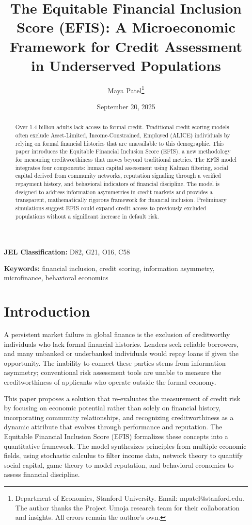 \documentclass{article}
\title{The Equitable Financial Inclusion Score (EFIS): A Microeconomic Framework for Credit Assessment in Underserved Populations}
\author{Maya Patel\thanks{Department of Economics, Stanford University. Email: mpatel@stanford.edu. The author thanks the Project Umoja research team for their collaboration and insights. All errors remain the author's own.}}
\date{September 20, 2025}
\begin{document}
\maketitle

\doublespacing

\begin{abstract}
Over 1.4 billion adults lack access to formal credit. Traditional credit scoring models often exclude Asset-Limited, Income-Constrained, Employed (ALICE) individuals by relying on formal financial histories that are unavailable to this demographic. This paper introduces the Equitable Financial Inclusion Score (EFIS), a new methodology for measuring creditworthiness that moves beyond traditional metrics. The EFIS model integrates four components: human capital assessment using Kalman filtering, social capital derived from community networks, reputation signaling through a verified repayment history, and behavioral indicators of financial discipline. The model is designed to address information asymmetries in credit markets and provides a transparent, mathematically rigorous framework for financial inclusion. Preliminary simulations suggest EFIS could expand credit access to previously excluded populations without a significant increase in default risk.
\end{abstract}

\textbf{JEL Classification:} D82, G21, O16, C58

\textbf{Keywords:} financial inclusion, credit scoring, information asymmetry, microfinance, behavioral economics

\section{Introduction}

A persistent market failure in global finance is the exclusion of creditworthy individuals who lack formal financial histories. Lenders seek reliable borrowers, and many unbanked or underbanked individuals would repay loans if given the opportunity. The inability to connect these parties stems from information asymmetry; conventional risk assessment tools are unable to measure the creditworthiness of applicants who operate outside the formal economy.

This paper proposes a solution that re-evaluates the measurement of credit risk by focusing on economic potential rather than solely on financial history, incorporating community relationships, and recognizing creditworthiness as a dynamic attribute that evolves through performance and reputation. The Equitable Financial Inclusion Score (EFIS) formalizes these concepts into a quantitative framework. The model synthesizes principles from multiple economic fields, using stochastic calculus to filter income data, network theory to quantify social capital, game theory to model reputation, and behavioral economics to assess financial discipline.
\end{document}
